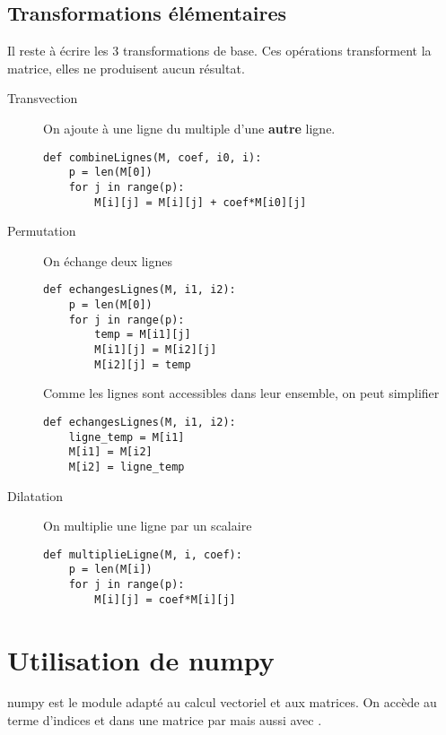 \subsection{Transformations élémentaires}
Il reste à écrire les 3 transformations de base. Ces opérations transforment la matrice, elles ne produisent aucun résultat.
\begin{description}
\item[Transvection] On ajoute à une ligne du multiple d'une \textbf{autre} ligne.
\begin{lstlisting}
def combineLignes(M, coef, i0, i):
    p = len(M[0]) 
    for j in range(p):  
        M[i][j] = M[i][j] + coef*M[i0][j]
\end{lstlisting}
\item[Permutation] On échange deux lignes
\begin{lstlisting}
def echangesLignes(M, i1, i2):
    p = len(M[0]) 
    for j in range(p):  
        temp = M[i1][j]
        M[i1][j] = M[i2][j]
        M[i2][j] = temp
\end{lstlisting}
Comme les lignes sont accessibles dans leur ensemble, on peut simplifier
\begin{lstlisting}
def echangesLignes(M, i1, i2):
    ligne_temp = M[i1]
    M[i1] = M[i2]
    M[i2] = ligne_temp
\end{lstlisting}
\item[Dilatation] On multiplie une ligne par un scalaire
\begin{lstlisting}
def multiplieLigne(M, i, coef):
    p = len(M[i])  
    for j in range(p):
        M[i][j] = coef*M[i][j]
\end{lstlisting}
\end{description}
\section{Utilisation de {\sc numpy}}
{\sc numpy} est le module adapté au calcul vectoriel et aux matrices. On accède au terme d'indices  et  dans une matrice  par  mais aussi avec .
